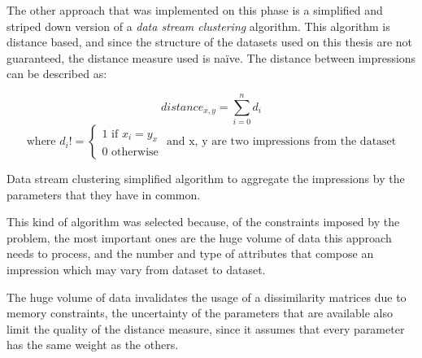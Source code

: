 The other approach that was implemented on this phase is a simplified and
striped down version of a \emph{data stream clustering} algorithm. This
algorithm is distance based, and since the structure of the datasets used on
this thesis are not guaranteed, the distance measure used is na\"{i}ve. The
distance between impressions can be described as:

\begin{center}
\begin{equation*}
  distance_{x,y}= \sum\limits_{i=0}^n d_i
\end{equation*}
\begin{equation*}
\text{where } d_i != \begin{cases} \text{1 if } x_i = y_x\\
\text{0 otherwise}\end{cases} \text{ and x, y are two impressions from the
dataset}
\end{equation*}
\end{center}

\begin{algorithm}
  \LinesNumbered
  \BlankLine

  \BlankLine

  \caption[Data stream clustering]{
    Data stream clustering simplified algorithm to aggregate the impressions by
    the parameters that they have in common.
  }
  \label{alg:pam} \end{algorithm}

This kind of algorithm was selected because, of the constraints imposed by the
problem, the most important ones are the huge volume of data this approach
needs to process, and the number and type of attributes that compose an
impression which may vary from dataset to dataset.

The huge volume of data invalidates the usage of a
dissimilarity matrices due to memory constraints, the uncertainty of the
parameters that are available also limit the quality of the distance measure,
since it assumes that every parameter has the same weight as the others.

